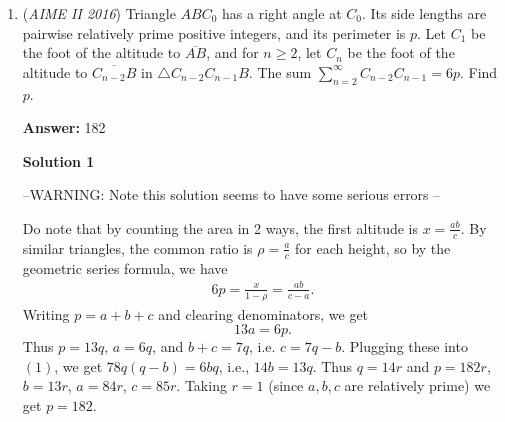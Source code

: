 \begin{enumerate}
 



\textbf{Solution 2}

The total number of green cubes is given by $12a=20b\Longrightarrow a=\frac{5}{3}b$. 

 Let $r$ be the number of red cubes on each one of the $b$ layers then the total number of red cubes is $9a=br$. Substitute $a=\frac{5}{3}b$ gives $r=15$.

 Repeating the procedure on the number of yellow cubes $y$ on each of the $a$ layers gives $y=15$.

 Therefore $bc=9+12+15=36$ and $ac=15+20+25=60$. Multiplying yields $abc^2=2160$.

 Since $abc^2$ is fixed, $abc$ is minimized when $c$ is maximized, which occurs when $a$, $b$ are minimized (since each of $ac$, $bc$ is fixed). Thus $(a,b,c)=(3,5,12)\Longrightarrow abc=\boxed{180}$



	\item (\textit{AIME II 2016}) Triangle $ABC_0$ has a right angle at $C_0$. Its side lengths are pairwise relatively prime positive integers, and its perimeter is $p$. Let $C_1$ be the foot of the altitude to $\overline{AB}$, and for $n \geq 2$, let $C_n$ be the foot of the altitude to $\overline{C_{n-2}B}$ in $\triangle C_{n-2}C_{n-1}B$. The sum $\sum_{n=2}^\infty C_{n-2}C_{n-1} = 6p$. Find $p$.


 
 \textbf{Answer: }182



\textbf{Solution 1}

--WARNING: Note this solution seems to have some serious errors --

 Do note that by counting the area in 2 ways, the first altitude is $x = \frac{ab}{c}$. By similar triangles, the common ratio is $\rho = \frac{a}{c}$ for each height, so by the geometric series formula, we have 
 \begin{align}     6p=\frac{x}{1-\rho} = \frac{ab}{c-a}. \end{align}Writing $p=a+b+c$ and clearing denominators, we get 
 \[13a=6p .\]Thus $p=13q$, $a=6q$, and $b+c=7q$, i.e. $c=7q-b$. Plugging these into $(1)$, we get $78q(q-b)=6bq$, i.e., $14b=13q$. Thus $q=14r$ and $p=182r$, $b=13r$, $a=84r$, $c=85r$. Taking $r=1$ (since $a,b,c$ are relatively prime) we get $p=\boxed{182}$.

 




\end{enumerate}
